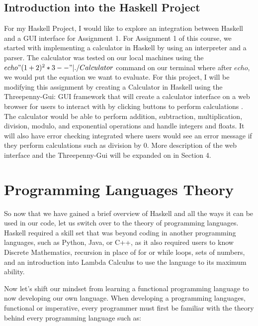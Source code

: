 \documentclass{article}
\begin{document}
\subsection{Introduction into the Haskell Project}

For my Haskell Project, I would like to explore an integration between Haskell and a GUI interface for Assignment 1. For Assignment 1 of this course, we started with implementing a calculator in Haskell by using an  interpreter and a parser. The calculator was tested on our local machines using the $echo "(1+2)^2 *3--" | ./Calculator$ command on our terminal where after $echo$, we would put the equation we want to evaluate. For this project, I will be modifying this assignment by creating a Calculator in Haskell using the Threepenny-Gui: GUI framework that will create a calculator interface on a web browser for users to interact with by clicking buttons to perform calculations \cite{Threepenny}. The calculator would be able to perform addition, subtraction, multiplication, division, modulo, and exponential operations and handle integers and floats. It will also have error checking integrated where users would see an error message if they perform calculations such as division by 0. More description of the web interface and the Threepenny-Gui will be expanded on in Section 4.

\section{Programming Languages Theory}
So now that we have gained a brief overview of Haskell and all the ways it can be used in our code, let us switch over to the theory of programming languages. Haskell required a skill set that was beyond coding in another programming languages, such as Python, Java, or C++, as it also required users to know Discrete Mathematics, recursion in place of for or while loops, sets of numbers, and an introduction into Lambda Calculus to use the language to its maximum ability.

\medskip\noindent
Now let's shift our mindset from learning a functional programming language to now developing our own language. When developing a programming languages, functional or imperative, every programmer must first be familiar with the theory behind every programming language such as:
\end{document}
